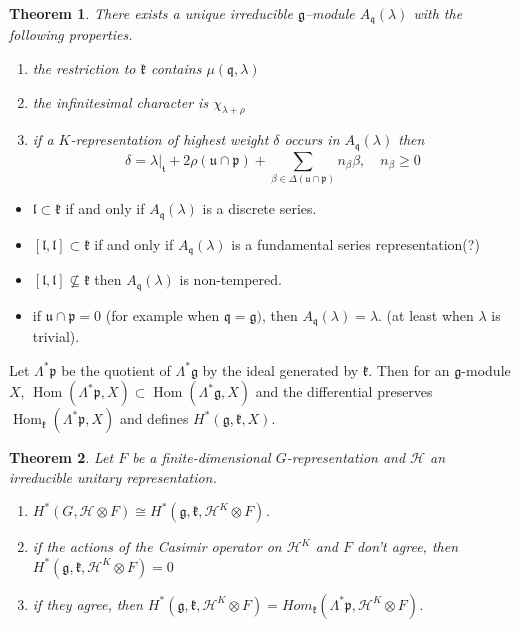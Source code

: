 \documentclass[leqno]{amsart}
\newcommand{\1}{\mathbf{1}}
\newcommand{\cfg}{\mathfrak{g}}
\newcommand{\cfk}{\mathfrak{k}}
\newcommand{\cfp}{\mathfrak{p}}
\newcommand{\cfq}{\mathfrak{q}}
\newcommand{\cfu}{\mathfrak{u}}
\newcommand{\cfl}{\mathfrak{l}}
\newcommand{\cft}{\mathfrak{t}}
\DeclareMathOperator{\Hom}{Hom}
\newtheorem{thm}{Theorem}[section]
\theoremstyle{definition}
\theoremstyle{remark}
\begin{document}
\begin{thm}
	There exists a unique irreducible $\cfg$--module
	$A_\cfq(\lambda)$ with the following properties.
	  \begin{enumerate}[label=(\alph*)]
	 	\item the restriction to $\cfk$
			contains $\mu(\cfq,\lambda)$
		\item the infinitesimal character is 
			$\chi_{\lambda+\rho}$
		\item if a  $K$-representation of highest weight
			$\delta$ occurs in  $A_\cfq(\lambda)$
			then 
			 \[
				\delta=\lambda\vert_{\cft}
				+2\rho(\cfu\cap\cfp)
			+\sum_{\beta\in \Delta(\cfu\cap\cfp)}
				n_\beta\beta,\quad n_\beta\geq 0
			\]
	 \end{enumerate}
\end{thm}
\begin{itemize}
	\item $\cfl\subset\cfk$ if and only if $A_\cfq(\lambda)$
		is a discrete series.
	\item  $[\cfl,\cfl]\subset\cfk$ if and only if
		$A_\cfq(\lambda)$ is a fundamental series 
		representation(?) 
	\item  $[\cfl,\cfl]\nsubseteq\cfk$ then
		$A_\cfq(\lambda)$ is non-tempered.
	\item if  $\cfu\cap\cfp=0$ 
		(for example when  $\cfq=\cfg)$,
		then  $A_\cfq(\lambda)=\lambda$.
		(at least when $\lambda$ is trivial).
\end{itemize}

Let $\Lambda^*\cfp$ be the quotient of   $\Lambda^*\cfg$
by the ideal generated by  $\cfk$.
Then for an $\cfg$-module  $X$,
$\Hom(\Lambda^*\cfp,X)\subset \Hom(\Lambda^*\cfg,X)$
and the differential preserves $\Hom_\cfk(\Lambda^*\cfp,X)$
and defines  $H^*(\cfg,\cfk,X)$.

\begin{thm}
	Let $F$ be a finite-dimensional $G$-representation
	and  $\mathcal{H}$ an irreducible unitary representation.
	\begin{enumerate}[label=(\alph*)]
		\item $H^*(G,\mathcal{H}\otimes F)\cong 
			H^*(\cfg,\cfk,\mathcal{H}^K\otimes F)$.
		\item if the actions of the Casimir operator
			on $\mathcal{H}^K$ and $F$
			don't agree, then
			$H^*(\cfg,\cfk,\mathcal{H}^K\otimes F)=0$
		\item if they agree, then
			 $H^*(\cfg,\cfk,\mathcal{H}^K\otimes F)=
		  Hom_\cfk(\Lambda^*\cfp,\mathcal{H}^K\otimes F)$.
	\end{enumerate}
\end{thm}
\end{document}
